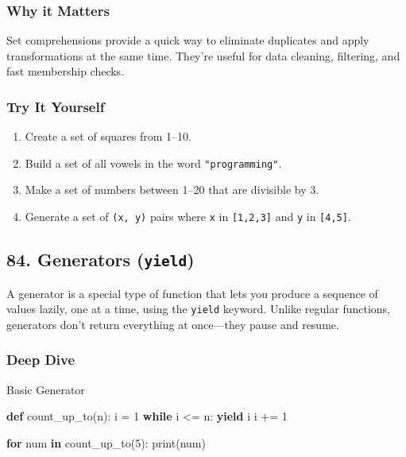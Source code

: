 \documentclass[
  letterpaper,
  DIV=11,
  numbers=noendperiod]{scrreprt}
\newenvironment{Shaded}{\begin{snugshade}}{\end{snugshade}}
\newcommand{\BuiltInTok}[1]{\textcolor[rgb]{0.00,0.23,0.31}{#1}}
\newcommand{\ControlFlowTok}[1]{\textcolor[rgb]{0.00,0.23,0.31}{\textbf{#1}}}
\newcommand{\DecValTok}[1]{\textcolor[rgb]{0.68,0.00,0.00}{#1}}
\newcommand{\KeywordTok}[1]{\textcolor[rgb]{0.00,0.23,0.31}{\textbf{#1}}}
\newcommand{\NormalTok}[1]{\textcolor[rgb]{0.00,0.23,0.31}{#1}}
\newcommand{\OperatorTok}[1]{\textcolor[rgb]{0.37,0.37,0.37}{#1}}
\providecommand{\tightlist}{%
  \setlength{\itemsep}{0pt}\setlength{\parskip}{0pt}}
\begin{document}
\subsubsection{Why it Matters}\label{why-it-matters-82}

Set comprehensions provide a quick way to eliminate duplicates and apply
transformations at the same time. They're useful for data cleaning,
filtering, and fast membership checks.

\subsubsection{Try It Yourself}\label{try-it-yourself-82}

\begin{enumerate}
\def\labelenumi{\arabic{enumi}.}
\tightlist
\item
  Create a set of squares from 1--10.
\item
  Build a set of all vowels in the word \texttt{"programming"}.
\item
  Make a set of numbers between 1--20 that are divisible by 3.
\item
  Generate a set of \texttt{(x,\ y)} pairs where \texttt{x} in
  \texttt{{[}1,2,3{]}} and \texttt{y} in \texttt{{[}4,5{]}}.
\end{enumerate}

\subsection{\texorpdfstring{84. Generators
(\texttt{yield})}{84. Generators (yield)}}\label{generators-yield}

A generator is a special type of function that lets you produce a
sequence of values lazily, one at a time, using the \texttt{yield}
keyword. Unlike regular functions, generators don't return everything at
once---they pause and resume.

\subsubsection{Deep Dive}\label{deep-dive-83}

Basic Generator

\begin{Shaded}
\begin{Highlighting}[]
\KeywordTok{def}\NormalTok{ count\_up\_to(n):}
\NormalTok{    i }\OperatorTok{=} \DecValTok{1}
    \ControlFlowTok{while}\NormalTok{ i }\OperatorTok{\textless{}=}\NormalTok{ n:}
        \ControlFlowTok{yield}\NormalTok{ i}
\NormalTok{        i }\OperatorTok{+=} \DecValTok{1}

\ControlFlowTok{for}\NormalTok{ num }\KeywordTok{in}\NormalTok{ count\_up\_to(}\DecValTok{5}\NormalTok{):}
    \BuiltInTok{print}\NormalTok{(num)}
\end{Highlighting}
\end{Shaded}
\end{document}
